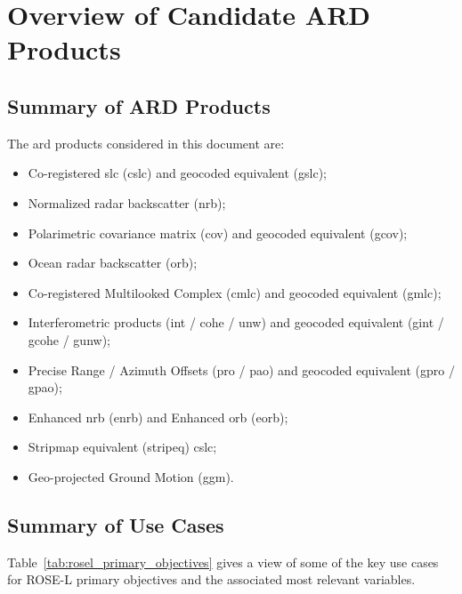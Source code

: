 \section{Overview of Candidate ARD Products}

\subsection{Summary of ARD Products}
The \acs{ard} products considered in this document are:
    \begin{itemize}
        \item Co-registered \acs{slc} (\acs{cslc}) and geocoded equivalent (\acs{gslc});
        \item Normalized radar backscatter (\acs{nrb});
        \item Polarimetric covariance matrix (\acs{cov}) and geocoded equivalent (\acs{gcov});
        \item Ocean radar backscatter (\acs{orb});
        \item Co-registered Multilooked Complex (\acs{cmlc}) and geocoded equivalent (\acs{gmlc});
        \item Interferometric products (\acs{int} / \acs{cohe} / \acs{unw}) and geocoded equivalent (\acs{gint} / \acs{gcohe} / \acs{gunw});
        \item Precise Range / Azimuth Offsets (\acs{pro} / \acs{pao}) and geocoded equivalent (\acs{gpro} / \acs{gpao});
        \item Enhanced \acs{nrb} (\acs{enrb}) and Enhanced \acs{orb} (\acs{eorb});
        \item Stripmap equivalent (\acs{stripeq}) \acs{cslc};
        \item Geo-projected Ground Motion (\acs{ggm}).
    \end{itemize}
\pagebreak

\subsection{Summary of Use Cases}
Table~\ref{tab:rosel_primary_objectives} gives a view of some of the key use cases for ROSE-L primary objectives and the associated most relevant variables.

